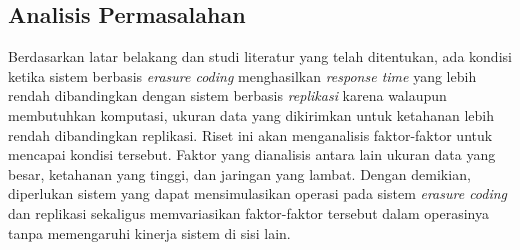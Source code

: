 \subsection{Analisis Permasalahan}
\label{sec:analisis-permasalahan}


Berdasarkan latar belakang dan studi literatur yang telah ditentukan, ada kondisi ketika sistem berbasis \textit{erasure coding} menghasilkan \textit{response time} yang lebih rendah dibandingkan dengan sistem berbasis \textit{replikasi} karena walaupun membutuhkan komputasi, ukuran data yang dikirimkan untuk ketahanan lebih rendah dibandingkan replikasi. Riset ini akan menganalisis faktor-faktor untuk mencapai kondisi tersebut. Faktor yang dianalisis antara lain ukuran data yang besar, ketahanan yang tinggi, dan jaringan yang lambat. Dengan demikian, diperlukan sistem yang dapat mensimulasikan operasi pada sistem \textit{erasure coding} dan replikasi sekaligus memvariasikan faktor-faktor tersebut dalam operasinya tanpa memengaruhi kinerja sistem di sisi lain.
  